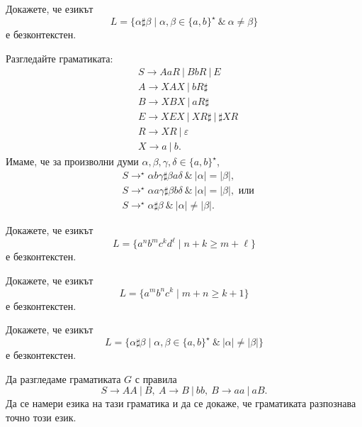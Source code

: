 \begin{problem}
 Докажете, че езикът
 \[L = \{\alpha \sharp \beta \mid \alpha,\beta \in \{a,b\}^\star\ \&\ \alpha \neq \beta \}\]
 е безконтекстен.
\end{problem}
\begin{hint}
  Разгледайте граматиката:
  \begin{align*}
    & S \to AaR\ |\ BbR\ |\ E\\
    & A \to XAX\ |\ bR\sharp\\
    & B \to XBX\ |\ aR\sharp\\
    & E \to XEX\ |\ XR\sharp\ |\ \sharp XR\\
    & R \to XR\ |\ \varepsilon\\
    & X \to a\ |\ b.
  \end{align*}
  Имаме, че за произволни думи $\alpha,\beta,\gamma,\delta \in \{a,b\}^\star$,
  \begin{align*}
    & S \to^\star \alpha b \gamma \sharp \beta a \delta\ \&\ |\alpha| = |\beta|,\\
    & S \to^\star \alpha a \gamma \sharp \beta b \delta\ \&\ |\alpha| = |\beta|, \text{ или}\\
    & S \to^\star \alpha \sharp \beta\ \&\ |\alpha| \neq |\beta|.
  \end{align*}      
\end{hint}






\begin{problem}
  Докажете, че езикът 
  \[L = \{a^nb^mc^kd^\ell \mid n+k \geq m + \ell\}\]
  е безконтекстен.
\end{problem}

\begin{problem}
  Докажете, че езикът 
  \[L = \{a^mb^nc^k\mid m+n \geq k + 1\}\]
  е безконтекстен.  
\end{problem}

\begin{problem}
  Докажете, че езикът
  \[L = \{\alpha \sharp \beta \mid \alpha,\beta \in \{a,b\}^\star\ \&\ |\alpha| \neq |\beta| \}\]
  е безконтекстен.
\end{problem}

\begin{problem}
  Да разгледаме граматиката $G$ с правила
  \[S \to AA\ |\ B,\ A \to B\ |\ bb,\ B \to aa\ |\ aB.\]
  Да се намери езика на тази граматика и да се докаже, че граматиката разпознава точно този език.
\end{problem}

